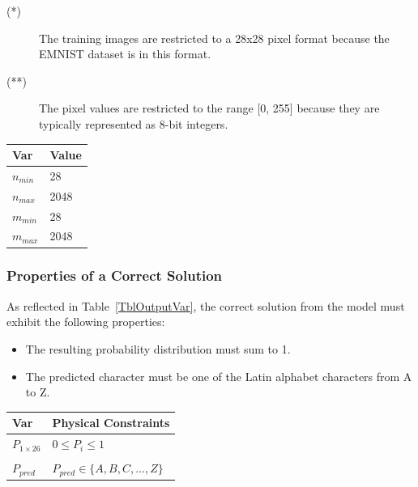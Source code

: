 \documentclass[12pt]{article}
\begin{document}
\noindent 
\begin{description}
\item[(*)] The training images are restricted to a 28x28 pixel format because
the EMNIST dataset is in this format.
\item[(**)] The pixel values are restricted to the range [0, 255] because they
are typically represented as 8-bit integers.
\end{description}

\begin{table}[!h]
\caption{Specification Parameter Values} \label{TblSpecParams}
\renewcommand{\arraystretch}{1.2}
\noindent \begin{longtable*}{l l} 
  \toprule
  \textbf{Var} & \textbf{Value} \\
  \midrule 
  $n_{min}$ & 28 \\
  $n_{max}$ & 2048 \\
  $m_{min}$ & 28 \\
  $m_{max}$ & 2048 \\
  \bottomrule
\end{longtable*}
\end{table}

\subsubsection{Properties of a Correct Solution} \label{sec_CorrectSolution}

\noindent
As reflected in Table~\ref{TblOutputVar}, the correct solution from the model
must exhibit the following properties:

\begin{itemize}
  \item The resulting probability distribution must sum to 1.
  \item The predicted character must be one of the Latin alphabet
  characters from A to Z. 
\end{itemize}


\begin{table}[!h]
\caption{Output Variables} \label{TblOutputVar}
\renewcommand{\arraystretch}{1.2}
\noindent \begin{longtable*}{l l} 
  \toprule
  \textbf{Var} & \textbf{Physical Constraints} \\
  \midrule 
  $P_{1 \times 26}$ & $0 \leq P_i \leq 1$ \\
  \\
  $P_{pred}$ & $P_{pred} \in \{A, B, C, ..., Z\}$ \\
  \bottomrule
\end{longtable*}
\end{table}
\end{document}
